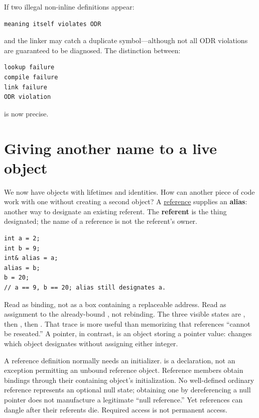 If two illegal non-inline definitions appear:

\begin{verbatim}
meaning itself violates ODR
\end{verbatim}

and the linker may catch a duplicate symbol---although not all ODR violations are guaranteed to be diagnosed. The distinction between:

\begin{verbatim}
lookup failure
compile failure
link failure
ODR violation
\end{verbatim}

is now precise.

\section{Giving another name to a live object}\label{01-foundations-i-ch003-giving-another-name-to-a-live-object}

\hypertarget{01-foundations-i-ch003-giving-another-name-to-a-live-object}{}

We now have objects with lifetimes and identities. How can another piece of code work with one without creating a second object? A \hyperref[appendix-d6d562ca9fbb]{reference} supplies an \textbf{alias}: another way to designate an existing referent. The \textbf{referent} is the thing designated; the name of a reference is not the referent's owner.

\begin{verbatim}
int a = 2;
int b = 9;
int& alias = a;
alias = b;
b = 20;
// a == 9, b == 20; alias still designates a.
\end{verbatim}

Read  as binding, not as a box containing a replaceable address. Read  as assignment to the already-bound , not rebinding. The three visible states are , then , then . That trace is more useful than memorizing that references ``cannot be reseated.'' A pointer, in contrast, is an object storing a pointer value:  changes which object  designates without assigning either integer.

A reference definition normally needs an initializer.  is a declaration, not an exception permitting an unbound reference object. Reference members obtain bindings through their containing object's initialization. No well-defined ordinary reference represents an optional null state; obtaining one by dereferencing a null pointer does not manufacture a legitimate ``null reference.'' Yet references can dangle after their referents die. Required access is not permanent access.

